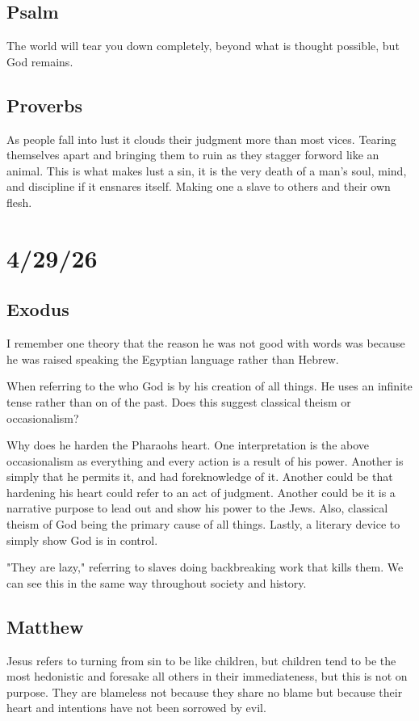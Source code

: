 \subsection{Psalm}
The world will tear you down completely, beyond what is thought possible, but God remains.
\subsection{Proverbs}
As people fall into lust it clouds their judgment more than most vices. Tearing themselves apart and bringing them to ruin as they stagger forword like an animal. This is what makes lust a sin, it is the very death of a man's soul, mind, and discipline if it ensnares itself. Making one a slave to others and their own flesh.

\section{4/29/26}
\subsection{Exodus}
I remember one theory that the reason he was not good with words was because he was raised speaking the Egyptian language rather than Hebrew.

When referring to the who God is by his creation of all things. He uses an infinite tense rather than on of the past. Does this suggest classical theism or occasionalism?

Why does he harden the Pharaohs heart. One interpretation is the above occasionalism as everything and every action is a result of his power. Another is simply that he permits it, and had foreknowledge of it. Another could be that hardening his heart could refer to an act of judgment. Another could be it is a narrative purpose to lead out and show his power to the Jews. Also, classical theism of God being the primary cause of all things. Lastly, a literary device to simply show God is in control.

"They are lazy," referring to slaves doing backbreaking work that kills them. We can see this in the same way throughout society and history.

\subsection{Matthew}
Jesus refers to turning from sin to be like children, but children tend to be the most hedonistic and foresake all others in their immediateness, but this is not on purpose. They are blameless not because they share no blame but because their heart and intentions have not been sorrowed by evil.

